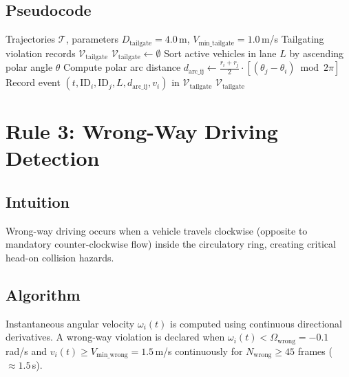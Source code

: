 \documentclass[12pt,a4paper]{report}
\begin{document}
\subsection{Pseudocode}
\begin{algorithm}[H]
\caption{Tailgating Detection Algorithm}
\label{alg:rule2}
\begin{algorithmic}[1]
\Require Trajectories $\mathcal{T}$, parameters $D_{\text{tailgate}} = 4.0$\,m, $V_{\text{min\_tailgate}} = 1.0$\,m/s
\Ensure Tailgating violation records $\mathcal{V}_{\text{tailgate}}$
\State $\mathcal{V}_{\text{tailgate}} \gets \emptyset$
    \State Sort active vehicles in lane $L$ by ascending polar angle $\theta$
        \State Compute polar arc distance $d_{\text{arc\_ij}} \gets \frac{r_i + r_j}{2} \cdot \left[(\theta_j - \theta_i) \bmod 2\pi\right]$
            \State Record event $(t, \text{ID}_i, \text{ID}_j, L, d_{\text{arc\_ij}}, v_i)$ in $\mathcal{V}_{\text{tailgate}}$
        \EndIf
    \EndFor
\EndFor
\State \Return $\mathcal{V}_{\text{tailgate}}$
\end{algorithmic}
\end{algorithm}

\section{Rule 3: Wrong-Way Driving Detection}
\label{sec:rule3}

\subsection{Intuition}
Wrong-way driving occurs when a vehicle travels clockwise (opposite to mandatory counter-clockwise flow) inside the circulatory ring, creating critical head-on collision hazards.

\subsection{Algorithm}
Instantaneous angular velocity $\omega_i(t)$ is computed using continuous directional derivatives. A wrong-way violation is declared when $\omega_i(t) < \Omega_{\text{wrong}} = -0.1$\,rad/s and $v_i(t) \ge V_{\text{min\_wrong}} = 1.5$\,m/s continuously for $N_{\text{wrong}} \ge 45$ frames ($\approx 1.5$\,s).
\end{document}
